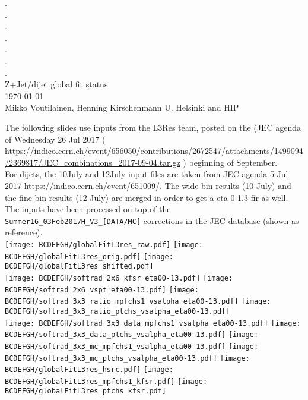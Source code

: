 \documentclass[landscape,10pt]{beamer} %
\begin{document}
\begin{centering}
{. }\\
{. }\\
{. }\\
{. }\\
{. }\\
{. }\\
{. }\\
Z+Jet/dijet global fit status\\
\today\\
Mikko Voutilainen, Henning Kirschenmann
U. Helsinki and HIP\\
\end{centering}
\newpage

The following slides use inputs from the L3Res team, posted on the (JEC agenda of Wednesday 26 Jul 2017 ( \url{https://indico.cern.ch/event/656050/contributions/2672547/attachments/1499094/2369817/JEC_combinations_2017-09-04.tar.gz} ) beginning of September.\\
For dijets, the 10July and 12July input files are taken from JEC agenda 5 Jul 2017 \url{https://indico.cern.ch/event/651009/}. The wide bin results (10 July) and the fine bin results (12 July) are merged in order to get a eta 0-1.3 fir as well.\\
The inputs have been processed on top of the \verb|Summer16_03Feb2017H_V3_[DATA/MC]| corrections in the JEC database (shown as reference).\\

\newpage
\texttt{[image: BCDEFGH/globalFitL3res\_raw.pdf]}
\texttt{[image: BCDEFGH/globalFitL3res\_orig.pdf]}
\texttt{[image: BCDEFGH/globalFitL3res\_shifted.pdf]}\\
\texttt{[image: BCDEFGH/softrad\_2x6\_kfsr\_eta00-13.pdf]}
\texttt{[image: BCDEFGH/softrad\_2x6\_vspt\_eta00-13.pdf]}
\texttt{[image: BCDEFGH/softrad\_3x3\_ratio\_mpfchs1\_vsalpha\_eta00-13.pdf]}
\texttt{[image: BCDEFGH/softrad\_3x3\_ratio\_ptchs\_vsalpha\_eta00-13.pdf]}\\

\texttt{[image: BCDEFGH/softrad\_3x3\_data\_mpfchs1\_vsalpha\_eta00-13.pdf]}
\texttt{[image: BCDEFGH/softrad\_3x3\_data\_ptchs\_vsalpha\_eta00-13.pdf]}
\texttt{[image: BCDEFGH/softrad\_3x3\_mc\_mpfchs1\_vsalpha\_eta00-13.pdf]} 
\texttt{[image: BCDEFGH/softrad\_3x3\_mc\_ptchs\_vsalpha\_eta00-13.pdf]}  
\texttt{[image: BCDEFGH/globalFitL3res\_hsrc.pdf]}
\texttt{[image: BCDEFGH/globalFitL3res\_mpfchs1\_kfsr.pdf]}
\texttt{[image: BCDEFGH/globalFitL3res\_ptchs\_kfsr.pdf]}\\
\end{document}
